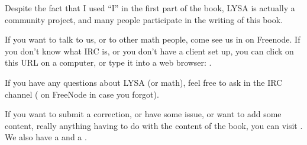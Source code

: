 
Despite the fact that I used ``I'' in the first part of the book, LYSA
is actually a community project, and many people participate in the
writing of this book.

If you want to talk to us, or to other math people, come see us in 
on Freenode. If you don't know what IRC is, or you don't have a client set up,
you can click on this URL on a computer, or type it into a web browser:
.

If you have any questions about LYSA (or math), feel free to ask in the
IRC channel ( on FreeNode in case you forgot).

If you want to submit a correction, or have some issue, or want to add
some content, really anything having to do with the content of the book,
you can visit . We also have a  and a
.